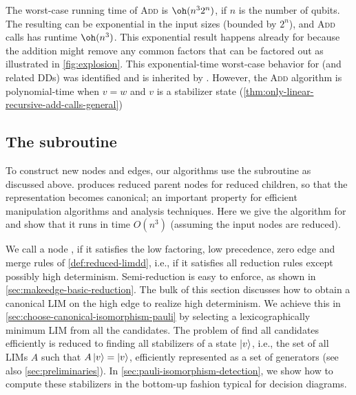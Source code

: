 The worst-case running time of \textsc{Add} is $\oh(n^32^n)$, if $n$ is the number of qubits.
The resulting \limdd can be exponential in the input sizes (bounded by $2^n$),
and \textsc{Add} calls \makeedge has runtime $\oh(n^3)$.
This exponential result happens already for \qmdds because the addition might remove any common factors that can be factored out as illustrated in \autoref{fig:explosion}.
This exponential-time worst-case behavior  for \qmdds (and related DDs)
 was identified \cite[Table 2]{fargier2014knowledge} and is inherited by \limdds.
However, the \textsc{Add} algorithm is polynomial-time when $v=w$ and $v$ is a stabilizer state (\autoref{thm:only-linear-recursive-add-calls-general})


\subsection{The \makeedge subroutine}
\label{sec:makeedge}


To construct new nodes and edges, our algorithms use the \makeedge subroutine as discussed above.
\makeedge produces reduced parent nodes for reduced children, so that the \limdd representation becomes canonical; an important property for efficient manipulation algorithms and analysis techniques. 
Here we give the algorithm for \makeedge and show that it runs in time $O(n^3)$ (assuming the input nodes are reduced).

We call a \limdd node , if it satisfies the
{low factoring, low precedence, zero edge and merge rules} of \autoref{def:reduced-limdd}, i.e., if it satisfies all reduction rules except possibly high determinism.
Semi-reduction is easy to enforce, as shown in \autoref{sec:makeedge-basic-reduction}.
The bulk of this section discusses how to obtain a canonical LIM on the high edge
to realize high determinism.
We achieve this  in \autoref{sec:choose-canonical-isomorphism-pauli} by selecting a lexicographically minimum LIM from all the candidates.
The problem of find all candidates efficiently is reduced to finding all stabilizers of a state $\ket v$,
i.e., the set of all LIMs $A$ such that $A \ket v = \ket v$, efficiently represented as a set of generators (see also \autoref{sec:preliminaries}).
In \autoref{sec:pauli-isomorphism-detection}, we show how to compute these stabilizers in the bottom-up fashion typical for decision diagrams.


